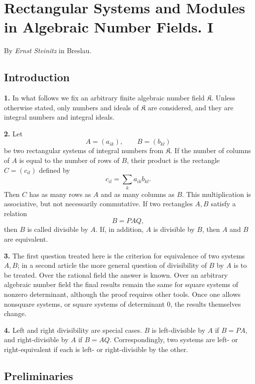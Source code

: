\documentclass[11pt,a4paper]{article}
\newcommand{\K}{\mathfrak K}
\begin{document}
\section*{Rectangular Systems and Modules in Algebraic Number Fields. I}
\begin{center}
By \emph{Ernst Steinitz} in Breslau.
\end{center}

\subsection*{Introduction}

\textbf{1.} In what follows we fix an arbitrary finite algebraic number field \(\K\). Unless otherwise stated, only numbers and ideals of \(\K\) are considered, and they are integral numbers and integral ideals.

\textbf{2.} Let
\[
 A=(a_{ik}),\qquad B=(b_{kl})
\]
be two rectangular systems of integral numbers from \(\K\). If the number of columns of \(A\) is equal to the number of rows of \(B\), their product is the rectangle \(C=(c_{il})\) defined by
\[
 c_{il}=\sum_k a_{ik}b_{kl}.
\]
Then \(C\) has as many rows as \(A\) and as many columns as \(B\). This multiplication is associative, but not necessarily commutative. If two rectangles \(A,B\) satisfy a relation
\[
 B=PAQ,
\]
then \(B\) is called divisible by \(A\). If, in addition, \(A\) is divisible by \(B\), then \(A\) and \(B\) are equivalent.

\textbf{3.} The first question treated here is the criterion for equivalence of two systems \(A,B\); in a second article the more general question of divisibility of \(B\) by \(A\) is to be treated. Over the rational field the answer is known. Over an arbitrary algebraic number field the final results remain the same for square systems of nonzero determinant, although the proof requires other tools. Once one allows nonsquare systems, or square systems of determinant \(0\), the results themselves change.

\textbf{4.} Left and right divisibility are special cases. \(B\) is left-divisible by \(A\) if \(B=PA\), and right-divisible by \(A\) if \(B=AQ\). Correspondingly, two systems are left- or right-equivalent if each is left- or right-divisible by the other.

\subsection*{Preliminaries}
\end{document}
